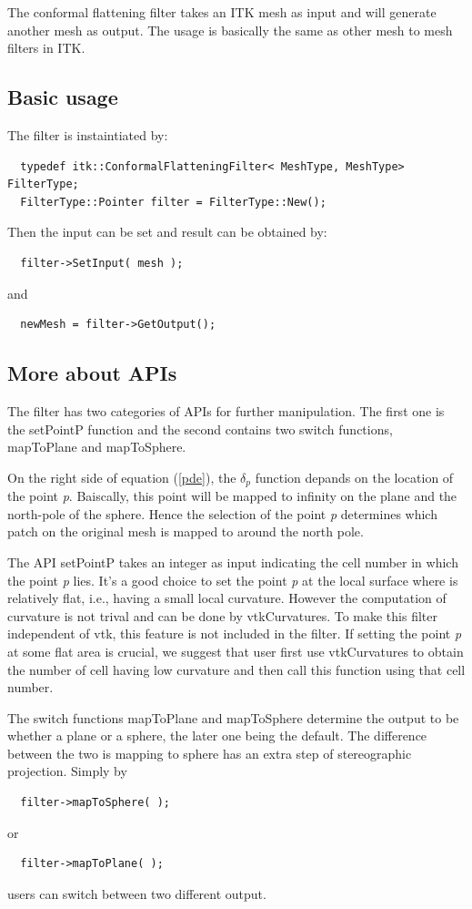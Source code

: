 \documentclass{InsightArticle}
\begin{document}
The conformal flattening filter takes an ITK mesh as input and will generate another mesh as output.
The usage is basically the same as other mesh to mesh filters in ITK.

\subsection{Basic usage}
The filter is instaintiated by:
\begin{verbatim}
  typedef itk::ConformalFlatteningFilter< MeshType, MeshType>  FilterType;
  FilterType::Pointer filter = FilterType::New();
\end{verbatim}
Then the input can be set and result can be obtained by:
\begin{verbatim}
  filter->SetInput( mesh ); 
\end{verbatim}
and
\begin{verbatim}
  newMesh = filter->GetOutput(); 
\end{verbatim}

\subsection{More about APIs}
The filter has two categories of APIs for further manipulation.
The first one is the setPointP function and the second contains two switch functions, mapToPlane and mapToSphere.

On the right side of equation (\ref{pde}), the $\delta_p$ function depands on the location of the point \emph{p}.
Baiscally, this point will be mapped to infinity on the plane and the north-pole of the sphere.
Hence the selection of the point \emph{p} determines which patch on the original mesh is mapped to around the north pole.

The API setPointP takes an integer as input indicating the cell number in which the point \emph{p} lies.
It's a good choice to set the point \emph{p} at the local surface where is relatively flat, i.e., having a small local curvature. 
However the computation of curvature is not trival and can be done by vtkCurvatures. 
To make this filter independent of vtk, this feature is not included in the filter.
If setting the point \emph{p} at some flat area is crucial, 
we suggest that user first use vtkCurvatures to obtain the number of cell having low curvature and then call this function using that cell number.

The switch functions mapToPlane and mapToSphere determine the output to be whether a plane or a sphere, the later one being the default.
The difference between the two is mapping to sphere has an extra step of stereographic projection.
Simply by
\begin{verbatim}
  filter->mapToSphere( ); 
\end{verbatim}
or
\begin{verbatim}
  filter->mapToPlane( ); 
\end{verbatim}
users can switch between two different output.
\end{document}
